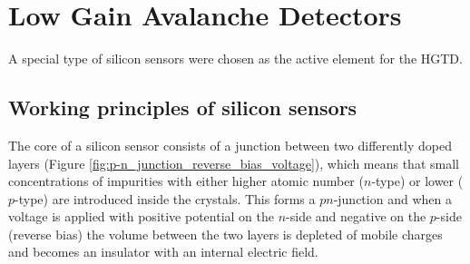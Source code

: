 


\section{Low Gain Avalanche Detectors}


A special type of silicon sensors were chosen as the active element for the HGTD.

\subsection{Working principles of silicon sensors}

The core of a silicon sensor consists of a junction between two differently doped layers (Figure \ref{fig:p-n_junction_reverse_bias_voltage}), which means that small concentrations of impurities with either higher atomic number ($n$-type) or lower ($p$-type) are introduced inside the crystals.
This forms a $pn$-junction and when a voltage is applied with positive potential on the $n$-side and negative on the $p$-side (reverse bias) the volume between the two layers is depleted of mobile charges and becomes an insulator with an internal electric field.

